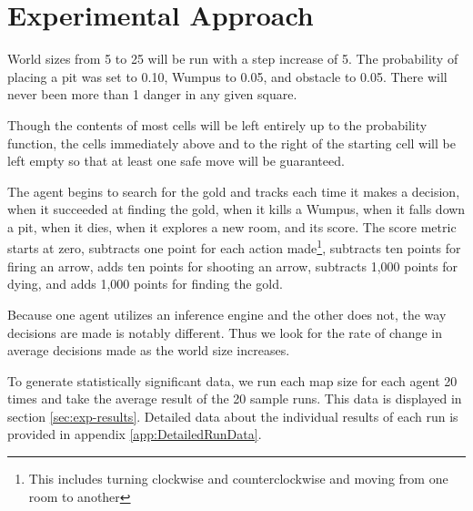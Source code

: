\section{Experimental Approach} \label{sec:exp approach}
World sizes from 5 to 25 will be run with a step increase of 5. 
The probability of placing a pit was set to 0.10, Wumpus to 0.05, and obstacle to 0.05. 
There will never been more than 1 danger in any given square.
 
Though the contents of most cells will be left entirely up to the probability function, the cells immediately above and to the right of the starting cell will be left empty so that at least one safe move will be guaranteed. 

The agent begins to search for the gold and tracks each time it makes a decision, when it succeeded at finding the gold, when it kills a Wumpus, when it falls down a pit, when it dies, when it explores a new room, and its score. 
The score metric starts at zero, subtracts one point for each action made\footnote{This includes turning clockwise and counterclockwise and moving from one room to another}, subtracts ten points for firing an arrow, adds ten points for shooting an arrow, subtracts 1,000 points for dying, and adds 1,000 points for finding the gold.

Because one agent utilizes an inference engine and the other does not, the way decisions are made is notably different.
Thus we look for the rate of change in average decisions made as the world size increases.

To generate statistically significant data, we run each map size for each agent 20 times and take the average result of the 20 sample runs.
This data is displayed in section \ref{sec:exp-results}.
Detailed data about the individual results of each run is provided in appendix \ref{app:DetailedRunData}.